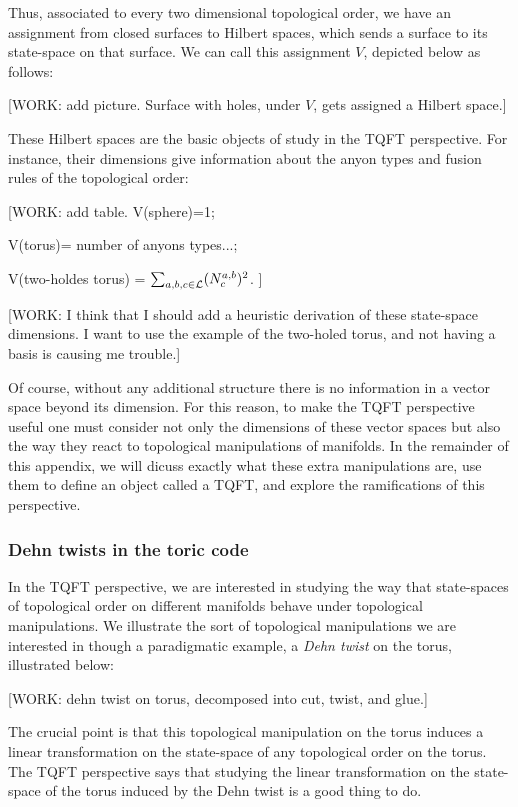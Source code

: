Thus, associated to every two dimensional topological order, we have an assignment from closed surfaces to Hilbert spaces, which sends a surface to its state-space on that surface. We can call this assignment $V$, depicted below as follows:

[WORK: add picture. Surface with holes, under $V$, gets assigned a Hilbert space.]

These Hilbert spaces are the basic objects of study in the TQFT perspective. For instance, their dimensions give information about the anyon types and fusion rules of the topological order:

[WORK: add table. 
V(sphere)=1;

V(torus)= number of anyons types...;

V(two-holdes torus) = $\sum_{a,b,c\in \mathcal{L}}(N^{a,b}_c)^2$.
]

[WORK: I think that I should add a heuristic derivation of these state-space dimensions. I want to use the example of the two-holed torus, and not having a basis is causing me trouble.]

Of course, without any additional structure there is no information in a vector space beyond its dimension. For this reason, to make the TQFT perspective useful one must consider not only the dimensions of these vector spaces but also the way they react to topological manipulations of manifolds. In the remainder of this appendix, we will dicuss exactly what these extra manipulations are, use them to define an object called a TQFT, and explore the ramifications of this perspective.

\subsubsection{Dehn twists in the toric code}

In the TQFT perspective, we are interested in studying the way that state-spaces of topological order on different manifolds behave under topological manipulations. We illustrate the sort of topological manipulations we are interested in though a paradigmatic example, a \textit{Dehn twist} on the torus, illustrated below:

[WORK: dehn twist on torus, decomposed into cut, twist, and glue.]

The crucial point is that this topological manipulation on the torus induces a linear transformation on the state-space of any topological order on the torus. The TQFT perspective says that studying the linear transformation on the state-space of the torus induced by the Dehn twist is a good thing to do.

